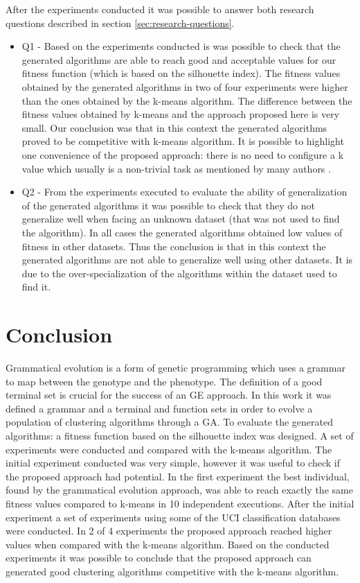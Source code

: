 \documentclass[journal]{IEEEtran}
\begin{document}
After the experiments conducted it was possible to answer both research questions described in section \ref{sec:research-questions}.
\begin{itemize}
	\item Q1 - Based on the experiments conducted is was possible to check that the generated algorithms are able to reach good and acceptable values for our fitness function (which is based on the silhouette index). The fitness values obtained by the generated algorithms in two of four experiments were higher than the ones obtained by the k-means algorithm. The difference between the fitness values obtained by k-means and the approach proposed here is very small. Our conclusion was that in this context the generated algorithms proved to be competitive with k-means algorithm. It is possible to highlight one convenience of the proposed approach: there is no need to configure a k value which usually is a non-trivial task as mentioned by many authors \cite{pham2005selection, yan2005methods, tibshirani2001estimating}.
	\item Q2 - From the experiments executed to evaluate the ability of generalization of the generated algorithms it was possible to check that they do not generalize well when facing an unknown dataset (that was not used to find the algorithm). In all cases the generated algorithms obtained low values of fitness in other datasets. Thus the conclusion is that in this context the generated algorithms are not able to generalize well using other datasets. It is due to the over-specialization of the algorithms within the dataset used to find it.
\end{itemize}


\section{Conclusion}

Grammatical evolution is a form of genetic programming which uses a grammar to map between the genotype and the phenotype. The definition of a good terminal set is crucial for the success of an GE approach. In this work it was defined a grammar and a terminal and function sets in order to evolve a population of clustering algorithms through a GA. To evaluate the generated algorithms: a fitness function based on the silhouette index was designed. A set of experiments were conducted and compared with the k-means algorithm. The initial experiment conducted was very simple, however it was useful to check if the proposed approach had potential. In the first experiment the best individual, found by the grammatical evolution approach, was able to reach exactly the same fitness values compared to k-means in 10 independent executions. After the initial experiment a set of experiments using some of the UCI classification databases were conducted. In 2 of 4 experiments the proposed approach reached higher values when compared with the k-means algorithm. Based on the conducted experiments it was possible to conclude that the proposed approach can generated good clustering algorithms competitive with the k-means algorithm.
\end{document}
